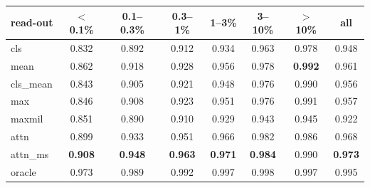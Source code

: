 \begin{tabular}{lccccccc}
\toprule
read-out & $<$0.1\% & 0.1--0.3\% & 0.3--1\% & 1--3\% & 3--10\% & $>$10\% & all \\
\midrule
cls & 0.832 & 0.892 & 0.912 & 0.934 & 0.963 & 0.978 & 0.948 \\
mean & 0.862 & 0.918 & 0.928 & 0.956 & 0.978 & \textbf{0.992} & 0.961 \\
cls\_mean & 0.843 & 0.905 & 0.921 & 0.948 & 0.976 & 0.990 & 0.956 \\
max & 0.846 & 0.908 & 0.923 & 0.951 & 0.976 & 0.991 & 0.957 \\
maxmil & 0.851 & 0.890 & 0.910 & 0.929 & 0.943 & 0.945 & 0.922 \\
attn & 0.899 & 0.933 & 0.951 & 0.966 & 0.982 & 0.986 & 0.968 \\
attn\_ms & \textbf{0.908} & \textbf{0.948} & \textbf{0.963} & \textbf{0.971} & \textbf{0.984} & 0.990 & \textbf{0.973} \\
\midrule
oracle & 0.973 & 0.989 & 0.992 & 0.997 & 0.998 & 0.997 & 0.995 \\
\bottomrule
\end{tabular}
